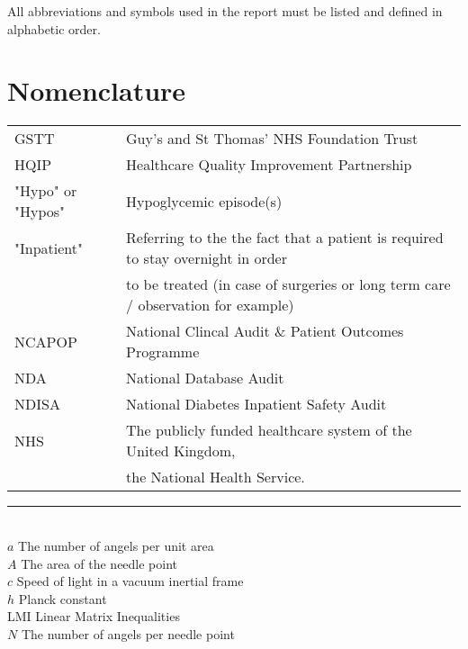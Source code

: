  All abbreviations and symbols used in the report must be listed and defined in alphabetic order.

\section*{Nomenclature}

\begin{flushleft}
\begin{minipage}{1\textwidth}
    	\centering
        \def\arraystretch{1.25}%
    	\begin{tabular}{ll}


			GSTT  & Guy's and St Thomas' NHS Foundation Trust \\
			HQIP & Healthcare Quality Improvement Partnership \\
			"Hypo" or "Hypos" & Hypoglycemic episode(s) \\

			"Inpatient" & Referring to the the fact that a patient is required to stay overnight in order \\
			& to be treated (in case of surgeries or long term care / observation for example) \\ 

			NCAPOP & National Clincal Audit \& Patient Outcomes Programme \\
			NDA   & National Database Audit  \\
    		NDISA & National Diabetes Inpatient Safety Audit \\  
    		NHS & The publicly funded healthcare system of the United Kingdom, \\ 
            & the National Health Service. \\
			
      
                
    	\end{tabular}
\end{minipage}

\end{flushleft}

\noindent\rule{8cm}{0.4pt} \\ %
$a$ \qquad The number of angels per unit area\\
$A$ \qquad The area of the needle point\\
$c$ \qquad Speed of light in a vacuum inertial frame\\
$h$ \qquad Planck constant\\
LMI	\qquad Linear Matrix Inequalities\\
$N$ \qquad The number of angels per needle point